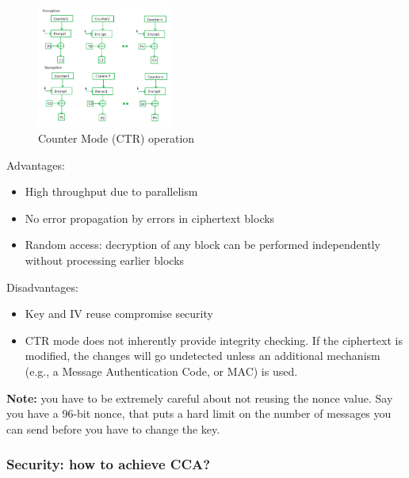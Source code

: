 \begin{figure}[h!]
    \centering
    \includegraphics[width=0.4\textwidth]{img/counter-mode.png}
    \caption{Counter Mode (CTR) operation}
    \label{fig:ctr}
\end{figure}

Advantages:
\begin{itemize}
    \item High throughput due to parallelism
    \item No error propagation by errors in ciphertext blocks
    \item Random access: decryption of any block can be performed independently without processing earlier blocks
\end{itemize}

Disadvantages:
\begin{itemize}
    \item Key and IV reuse compromise security
    \item CTR mode does not inherently provide integrity checking. If the ciphertext is modified, the changes will go undetected unless an additional mechanism (e.g., a Message Authentication Code, or MAC) is used.
\end{itemize}

\textbf{Note:} you have to be extremely careful about not reusing the nonce value. Say you have a 96-bit nonce, that puts a hard limit on the number of messages you can send before you have to change the key.

\subsubsection{Security: how to achieve CCA?}
